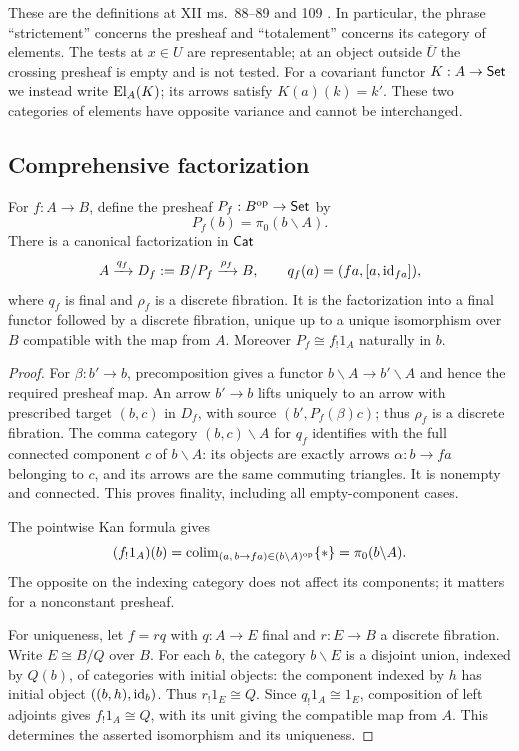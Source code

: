 These are the definitions at XII ms.~88--89 and 109 \citep{GrothendieckDerivateursXIIb}. In particular, the phrase ``strictement'' concerns the presheaf and ``totalement'' concerns its category of elements. The tests at $x\in U$ are representable; at an object outside $\overline U$ the crossing presheaf is empty and is not tested. For a covariant functor $K:A\to\mathsf{Set}$ we instead write $\operatorname{El}_A(K)$; its arrows satisfy $K(a)(k)=k'$. These two categories of elements have opposite variance and cannot be interchanged.

\subsection{Comprehensive factorization}

\begin{proposition}\label{A:comprehensive}
For $f:A\to B$, define the presheaf $P_f:B^{\mathrm{op}}\to\mathsf{Set}$ by
\[
 P_f(b)=\pi_0(b\backslash A).
\]
There is a canonical factorization in $\mathsf{Cat}$
\[
 A\xrightarrow{q_f}D_f:=B/P_f\xrightarrow{\rho_f}B,
 \qquad q_f(a)=(fa,[a,\mathrm{id}_{fa}]),
\]
where $q_f$ is final and $\rho_f$ is a discrete fibration. It is the factorization into a final functor followed by a discrete fibration, unique up to a unique isomorphism over $B$ compatible with the map from $A$. Moreover $P_f\cong f_!1_A$ naturally in $b$.
\end{proposition}

\begin{proof}
For $\beta:b'\to b$, precomposition gives a functor $b\backslash A\to b'\backslash A$ and hence the required presheaf map. An arrow $b'\to b$ lifts uniquely to an arrow with prescribed target $(b,c)$ in $D_f$, with source $(b',P_f(\beta)c)$; thus $\rho_f$ is a discrete fibration. The comma category $(b,c)\backslash A$ for $q_f$ identifies with the full connected component $c$ of $b\backslash A$: its objects are exactly arrows $\alpha:b\to fa$ belonging to $c$, and its arrows are the same commuting triangles. It is nonempty and connected. This proves finality, including all empty-component cases.

The pointwise Kan formula gives
\[
 (f_!1_A)(b)=\operatorname{colim}_{(a,\,b\to fa)\in(b\backslash A)^{\mathrm{op}}}\{*\}
 =\pi_0(b\backslash A).
\]
The opposite on the indexing category does not affect its components; it matters for a nonconstant presheaf.

For uniqueness, let $f=rq$ with $q:A\to E$ final and $r:E\to B$ a discrete fibration. Write $E\cong B/Q$ over $B$. For each $b$, the category $b\backslash E$ is a disjoint union, indexed by $Q(b)$, of categories with initial objects: the component indexed by $h$ has initial object $((b,h),\mathrm{id}_b)$. Thus $r_!1_E\cong Q$. Since $q_!1_A\cong1_E$, composition of left adjoints gives $f_!1_A\cong Q$, with its unit giving the compatible map from $A$. This determines the asserted isomorphism and its uniqueness.
\end{proof}

